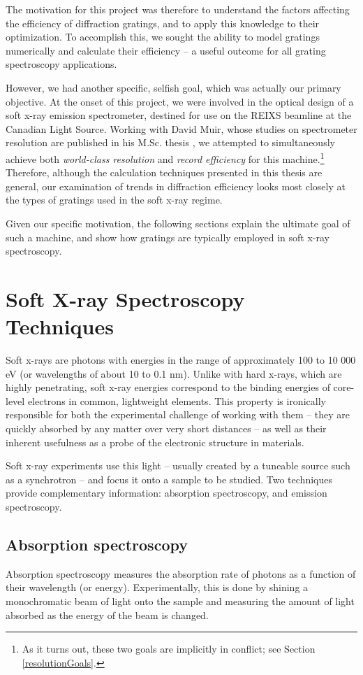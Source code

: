 The motivation for this project was therefore to understand the factors affecting the efficiency of diffraction gratings, and to apply this knowledge to their optimization.  To accomplish this, we sought the ability to model gratings numerically and calculate their efficiency -- a useful outcome for all grating spectroscopy applications.  

However, we had another specific, selfish goal, which was actually our primary objective.  At the onset of this project, we were involved in the optical design of a soft x-ray emission spectrometer, destined for use on the REIXS beamline at the Canadian Light Source.  Working with David Muir, whose studies on spectrometer resolution are published in his M.Sc. thesis \cite{Mui06}, we attempted to simultaneously achieve both \emph{world-class resolution} and \emph{record efficiency} for this machine.\footnote{As it turns out, these two goals are implicitly in conflict; see Section \ref{resolutionGoals}.}  Therefore, although the calculation techniques presented in this thesis are general, our examination of trends in diffraction efficiency looks most closely at the types of gratings used in the soft x-ray regime.

Given our specific motivation, the following sections explain the ultimate goal of such a machine, and show how gratings are typically employed in soft x-ray spectroscopy.

\section{Soft X-ray Spectroscopy Techniques}
Soft x-rays are photons with energies in the range of approximately 100 to 10 000 eV (or wavelengths of about 10 to 0.1 nm).  Unlike with hard x-rays, which are highly penetrating, soft x-ray energies correspond to the binding energies of core-level electrons in common, lightweight elements.  This property is ironically responsible for both the experimental challenge of working with them -- they are quickly absorbed by any matter over very short distances -- as well as their inherent usefulness as a probe of the electronic structure in materials.

Soft x-ray experiments use this light -- usually created by a tuneable source such as a synchrotron -- and focus it onto a sample to be studied.  Two techniques provide complementary information: absorption spectroscopy, and emission spectroscopy.

\subsection{Absorption spectroscopy}
Absorption spectroscopy measures the absorption rate of photons as a function of their wavelength (or energy).  Experimentally, this is done by shining a monochromatic beam of light onto the sample and measuring the amount of light absorbed as the energy of the beam is changed.  

